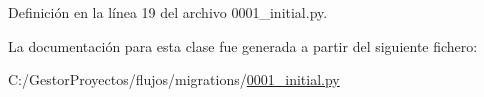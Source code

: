 Definición en la línea 19 del archivo 0001\+\_\+initial.\+py.



La documentación para esta clase fue generada a partir del siguiente fichero\+:\begin{DoxyCompactItemize}
\item 
C\+:/\+Gestor\+Proyectos/flujos/migrations/\hyperlink{flujos_2migrations_20001__initial_8py}{0001\+\_\+initial.\+py}\end{DoxyCompactItemize}
